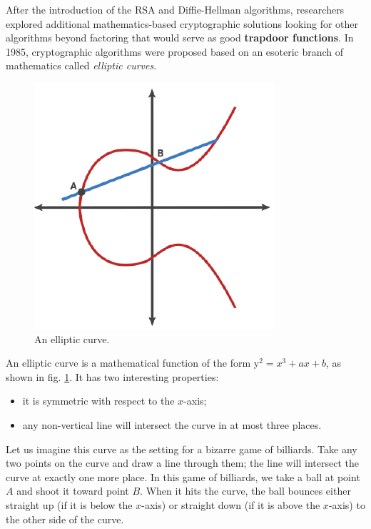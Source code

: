 After the introduction of the RSA and Diffie-Hellman algorithms, researchers explored additional mathematics-based cryptographic solutions looking for other algorithms beyond factoring that would serve as good \textbf{trapdoor functions}. In 1985, cryptographic algorithms were proposed based on an esoteric branch of mathematics called \textit{elliptic curves}.

\begin{figure}[H]
    \centering
    \includegraphics[scale=1]{img/elliptic.png}
    \decoRule
    \caption{An elliptic curve.}
    \label{fig:elliptic}
\end{figure}

An elliptic curve is a mathematical function of the form y$^2 = x^3 + ax + b$, as shown in fig. \ref{fig:elliptic}. It has two interesting properties:

\begin{itemize}
    \item it is symmetric with respect to the $x$-axis;
    \item any non-vertical line will intersect the curve in at most three places.
\end{itemize}

Let us imagine this curve as the setting for a bizarre game of billiards. Take any two points on the curve and draw a line through them; the line will intersect the curve at exactly one more place. In this game of billiards, we take a ball at point $A$ and shoot it toward point $B$. When it hits the curve, the ball bounces either straight up (if it is below the $x$-axis) or straight down (if it is above the $x$-axis) to the other side of the curve.

